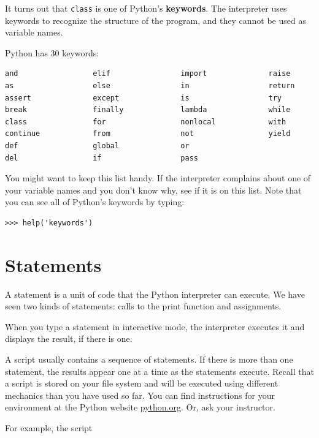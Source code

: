 \documentclass[10pt]{book}
\begin{document}
It turns out that {\tt class} is one of Python's {\bf keywords}.  The
interpreter uses keywords to recognize the structure of the program,
and they cannot be used as variable names.


Python has 30 keywords:

\beforeverb
\begin{verbatim}
and                 elif                import              raise
as                  else                in                  return
assert              except              is                  try
break               finally             lambda              while
class               for                 nonlocal            with
continue            from                not                 yield
def                 global              or                  
del                 if                  pass   
\end{verbatim}
\afterverb
%
You might want to keep this list handy.  If the interpreter complains
about one of your variable names and you don't know why, see if it
is on this list. Note that you can see all of Python's keywords by typing:

\beforeverb
\begin{verbatim}
>>> help('keywords')
\end{verbatim}
\afterverb

\section{Statements}

A statement is a unit of code that the Python interpreter can
execute.  We have seen two kinds of statements: calls to the print function
and assignments.


When you type a statement in interactive mode, the interpreter
executes it and displays the result, if there is one.

A script usually contains a sequence of statements.  If there
is more than one statement, the results appear one at a time
as the statements execute. Recall that a script is stored on your file system and will be executed using different mechanics than you have used so far. You can find instructions for your environment at the Python website \url{python.org}. Or, ask your instructor.

For example, the script
\end{document}
